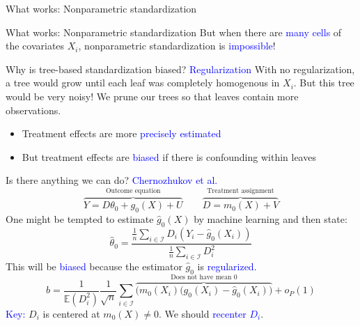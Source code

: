 \documentclass{beamer}
\newcommand{\E}{{\mathbb{E}}}
\newcommand{\blue}[1]{\textcolor{blue}{#1}}
\begin{document}
\begin{frame}{What works: Nonparametric standardization}
\end{frame}

\begin{frame}{What works: Nonparametric standardization}
\centering
\Large But when there are \blue{many cells} of the covariates $X_i$, \vskip 1cm
{\huge nonparametric standardization is \blue{impossible}!}
\end{frame}

\begin{frame}{Why is tree-based standardization biased? \blue{Regularization}}
With no regularization, a tree would grow until each leaf was completely homogenous in $X_i$. \vskip 1cm
But this tree would be very noisy! We prune our trees so that leaves contain more observations.
\begin{itemize}
\item Treatment effects are more \blue{precisely estimated}
\item But treatment effects are \blue{biased} if there is confounding within leaves
\end{itemize}
\end{frame}

\begin{frame}{Is there anything we can do? \blue{Chernozhukov et al.}}
$$\overbrace{Y = D\theta_0 + g_0(X) + U}^\text{Outcome equation}\qquad \overbrace{D = m_0(X) + V}^\text{Treatment assignment}$$
One might be tempted to estimate $\hat{g}_0(X)$ by machine learning and then state:
$$\hat\theta_0 = \frac{
\frac{1}{n}\sum_{i\in\mathcal{I}}D_i(Y_i-\hat{g}_0(X_i))
}{
\frac{1}{n}\sum_{i\in\mathcal{I}}D_i^2
}$$ \pause
This will be \blue{biased} because the estimator $\hat{g}_0$ is \blue{regularized}.
$$b = \frac{1}{\E(D_i^2)}\frac{1}{\sqrt{n}}\sum_{i\in\mathcal{I}}\overbrace{\bigg(m_0(X_i)(g_0(X_i) - \hat{g}_0(X_i)\bigg)}^\text{Does not have mean 0} + o_P(1)$$ \pause
\blue{Key:} $D_i$ is centered at $m_0(X)\neq 0$. We should \blue{recenter $D_i$}.
\end{frame}
\end{document}
